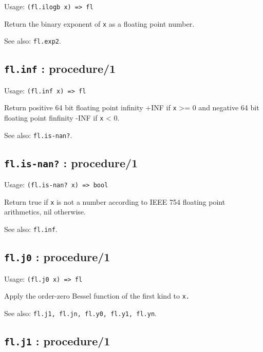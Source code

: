 \documentclass[
]{article}
\newcommand{\passthrough}[1]{#1}
\begin{document}
Usage: \passthrough{\lstinline!(fl.ilogb x) => fl!}

Return the binary exponent of \passthrough{\lstinline!x!} as a floating
point number.

See also: \passthrough{\lstinline!fl.exp2!}.

\hypertarget{fl.inf-procedure1-1}{%
\subsection{\texorpdfstring{\texttt{fl.inf} :
procedure/1}{fl.inf : procedure/1}}\label{fl.inf-procedure1-1}}

Usage: \passthrough{\lstinline!(fl.inf x) => fl!}

Return positive 64 bit floating point infinity +INF if
\passthrough{\lstinline!x!} \textgreater= 0 and negative 64 bit floating
point finfinity -INF if \passthrough{\lstinline!x!} \textless{} 0.

See also: \passthrough{\lstinline!fl.is-nan?!}.

\hypertarget{fl.is-nan-procedure1-1}{%
\subsection{\texorpdfstring{\texttt{fl.is-nan?} :
procedure/1}{fl.is-nan? : procedure/1}}\label{fl.is-nan-procedure1-1}}

Usage: \passthrough{\lstinline!(fl.is-nan? x) => bool!}

Return true if \passthrough{\lstinline!x!} is not a number according to
IEEE 754 floating point arithmetics, nil otherwise.

See also: \passthrough{\lstinline!fl.inf!}.

\hypertarget{fl.j0-procedure1-1}{%
\subsection{\texorpdfstring{\texttt{fl.j0} :
procedure/1}{fl.j0 : procedure/1}}\label{fl.j0-procedure1-1}}

Usage: \passthrough{\lstinline!(fl.j0 x) => fl!}

Apply the order-zero Bessel function of the first kind to
\passthrough{\lstinline!x.!}

See also: \passthrough{\lstinline!fl.j1, fl.jn, fl.y0, fl.y1, fl.yn!}.

\hypertarget{fl.j1-procedure1-1}{%
\subsection{\texorpdfstring{\texttt{fl.j1} :
procedure/1}{fl.j1 : procedure/1}}\label{fl.j1-procedure1-1}}
\end{document}
